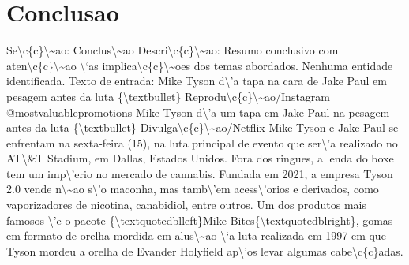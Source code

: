 \documentclass{article}%
\begin{document}
\section{Conclusao}%
\label{sec:Conclusao}%
Se\textbackslash{}c\{c\}\textbackslash{}\textasciitilde{}ao: Conclus\textbackslash{}\textasciitilde{}ao\newline%
Descri\textbackslash{}c\{c\}\textbackslash{}\textasciitilde{}ao: Resumo conclusivo com aten\textbackslash{}c\{c\}\textbackslash{}\textasciitilde{}ao \textbackslash{}`as implica\textbackslash{}c\{c\}\textbackslash{}\textasciitilde{}oes dos temas abordados.\newline%
\newline%
Nenhuma entidade identificada.\newline%
\newline%
Texto de entrada:\newline%
Mike Tyson d\textbackslash{}'a tapa na cara de Jake Paul em pesagem antes da luta\newline%
\{\textbackslash{}textbullet\} Reprodu\textbackslash{}c\{c\}\textbackslash{}\textasciitilde{}ao/Instagram @mostvaluablepromotions\newline%
\newline%
Mike Tyson d\textbackslash{}'a um tapa em Jake Paul na pesagem antes da luta\newline%
\{\textbackslash{}textbullet\} Divulga\textbackslash{}c\{c\}\textbackslash{}\textasciitilde{}ao/Netflix\newline%
\newline%
Mike Tyson e Jake Paul se enfrentam na sexta{-}feira (15), na luta principal de evento que ser\textbackslash{}'a realizado no AT\textbackslash{}\&T Stadium, em Dallas, Estados Unidos. Fora dos ringues, a lenda do boxe tem um imp\textbackslash{}'erio no mercado de cannabis.\newline%
\newline%
Fundada em 2021, a empresa Tyson 2.0 vende n\textbackslash{}\textasciitilde{}ao s\textbackslash{}'o maconha, mas tamb\textbackslash{}'em acess\textbackslash{}'orios e derivados, como vaporizadores de nicotina, canabidiol, entre outros. Um dos produtos mais famosos \textbackslash{}'e o pacote \{\textbackslash{}textquotedblleft\}Mike Bites\{\textbackslash{}textquotedblright\}, gomas em formato de orelha mordida em alus\textbackslash{}\textasciitilde{}ao \textbackslash{}`a luta realizada em 1997 em que Tyson mordeu a orelha de Evander Holyfield ap\textbackslash{}'os levar algumas cabe\textbackslash{}c\{c\}adas.\newline%
\end{document}
